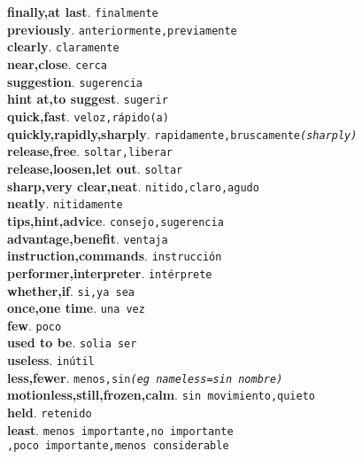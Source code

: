 \documentclass[twocolumn]{article}
\begin{document}
	\textsf{\textbf{finally,at last}}. \texttt{finalmente}\\
	\textsf{\textbf{previously}}. \texttt{anteriormente,previamente}\\
	\textsf{\textbf{clearly}}. \texttt{claramente}\\
	\textsf{\textbf{near,close}}. \texttt{cerca}\\
	\textsf{\textbf{suggestion}}. \texttt{sugerencia}\\
	\textsf{\textbf{hint at,to suggest}}. \texttt{sugerir}\\
	\textsf{\textbf{quick,fast}}. \texttt{veloz,r\'apido(a)}\\
	\textsf{\textbf{quickly,rapidly,sharply}}. \texttt{rapidamente,bruscamente{\scriptsize \textsl{(sharply)}}}\\
	\textsf{\textbf{release,free}}. \texttt{soltar,liberar}\\
	\textsf{\textbf{release,loosen,let out}}. \texttt{soltar}\\
	\textsf{\textbf{sharp,very clear,neat}}. \texttt{nitido,claro,agudo}\\
	\textsf{\textbf{neatly}}. \texttt{nitidamente}\\
	\textsf{\textbf{tips,hint,advice}}. \texttt{consejo,sugerencia}\\
	\textsf{\textbf{advantage,benefit}}. \texttt{ventaja}\\
	\textsf{\textbf{instruction,commands}}. \texttt{instrucci\'on}\\
	\textsf{\textbf{performer,interpreter}}. \texttt{int\'erprete}\\
	\textsf{\textbf{whether,if}}. \texttt{si,ya sea}\\
	\textsf{\textbf{once,one time}}. \texttt{una vez}\\
	\textsf{\textbf{few}}. \texttt{poco}\\
	\textsf{\textbf{used to be}}. \texttt{solia ser}\\
	\textsf{\textbf{useless}}. \texttt{in\'util}\\
	\textsf{\textbf{less,fewer}}. \texttt{menos,sin{\scriptsize \textsl{(eg nameless=sin nombre)}}}\\
	\textsf{\textbf{motionless,still,frozen,calm}}. \texttt{sin movimiento,quieto}\\
	\textsf{\textbf{held}}. \texttt{retenido}\\
	\textsf{\textbf{least}}. \texttt{menos importante,no importante\\,poco importante,menos considerable}\\
\end{document}
